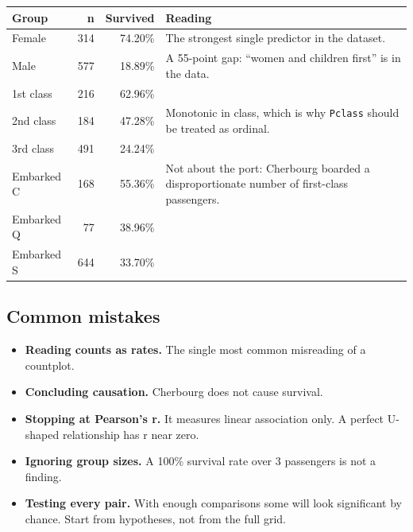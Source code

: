 \documentclass[11pt,a4paper]{article}
\begin{document}
\begin{tabularx}{\textwidth}{@{}l r r X@{}}
\toprule
\rowcolor{tablehead} \textbf{Group} & \textbf{n} & \textbf{Survived} & \textbf{Reading} \\
\midrule
Female & 314 & 74.20\% & The strongest single predictor in the dataset. \\
Male & 577 & 18.89\% & A 55-point gap: ``women and children first'' is in the data. \\
1st class & 216 & 62.96\% & \\
2nd class & 184 & 47.28\% & Monotonic in class, which is why \texttt{Pclass} should be treated as ordinal. \\
3rd class & 491 & 24.24\% & \\
Embarked C & 168 & 55.36\% & Not about the port: Cherbourg boarded a disproportionate number of first-class passengers. \\
Embarked Q & 77 & 38.96\% & \\
Embarked S & 644 & 33.70\% & \\
\bottomrule
\end{tabularx}



\subsection*{Common mistakes}

\begin{itemize}\itemsep3pt
  \item \textbf{Reading counts as rates.} The single most common misreading of a countplot.
  \item \textbf{Concluding causation.} Cherbourg does not cause survival.
  \item \textbf{Stopping at Pearson's r.} It measures linear association only. A perfect
        U-shaped relationship has r near zero.
  \item \textbf{Ignoring group sizes.} A 100\% survival rate over 3 passengers is not a
        finding.
  \item \textbf{Testing every pair.} With enough comparisons some will look significant by
        chance. Start from hypotheses, not from the full grid.
\end{itemize}
\end{document}
